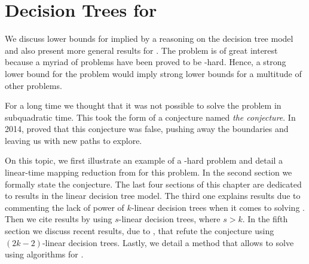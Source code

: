 \chapter{Decision Trees for \threeSUM}
\label{tree:3sum}

We discuss lower bounds for \threeSUM implied by a
reasoning on the decision tree model and also present more
general results for \kLDT. The \threeSUM problem is of great
interest because a myriad of problems
have been proved to be \threeSUM-hard. Hence, a strong lower bound for
the \threeSUM problem would imply strong lower bounds for a multitude of other
problems.

For a long time we thought that it was not possible to solve the \threeSUM
problem in subquadratic time. This took the form of a
conjecture named \emph{the \threeSUM conjecture}. In 2014, \citet*{gronlund:2014}
proved that this conjecture was false, pushing away the
boundaries and leaving us with new paths to explore.

On this topic, we first illustrate an example of a \threeSUM-hard problem
and detail a linear-time mapping reduction from \threeSUM for this problem. In
the second section we formally state the \threeSUM conjecture. The last
four sections of this chapter are dedicated to results in the linear
decision tree model. The third one explains results due to
\citet*{erickson:1999} commenting the lack of power of $k$-linear decision
trees when it comes to solving \ksum. Then we cite results by
\citet*{ailon:2005} using $s$-linear decision trees, where \(s > k\). In the fifth section
we discuss recent results, due to \citet*{gronlund:2014}, that refute
the \threeSUM conjecture using $(2k-2)$-linear decision trees. Lastly, we
detail a method that allows to solve \kLDT using algorithms for \threeSUM.
